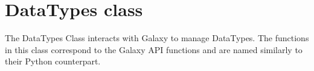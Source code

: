 \hypertarget{group__data__types__class}{}\section{Data\+Types class}
\label{group__data__types__class}
The Data\+Types Class interacts with Galaxy to manage Data\+Types. The functions in this class correspond to the Galaxy A\+PI functions and are named similarly to their Python counterpart. 